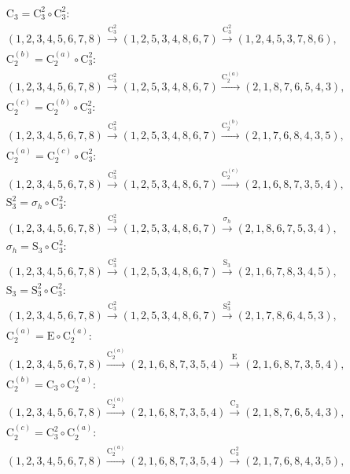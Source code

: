 \begin{align*}
& \mathrm{C}_{3} = \mathrm{C}_{3}^{2} \circ \mathrm{C}_{3}^{2}:\; \\& (1,2,3,4,5,6,7,8) \xrightarrow{\mathrm{C}_{3}^{2}} (1,2,5,3,4,8,6,7) \xrightarrow{\mathrm{C}_{3}^{2}} (1,2,4,5,3,7,8,6), \\
& \mathrm{C}_{2}^{(b)} = \mathrm{C}_{2}^{(a)} \circ \mathrm{C}_{3}^{2}:\; \\& (1,2,3,4,5,6,7,8) \xrightarrow{\mathrm{C}_{3}^{2}} (1,2,5,3,4,8,6,7) \xrightarrow{\mathrm{C}_{2}^{(a)}} (2,1,8,7,6,5,4,3), \\
& \mathrm{C}_{2}^{(c)} = \mathrm{C}_{2}^{(b)} \circ \mathrm{C}_{3}^{2}:\; \\& (1,2,3,4,5,6,7,8) \xrightarrow{\mathrm{C}_{3}^{2}} (1,2,5,3,4,8,6,7) \xrightarrow{\mathrm{C}_{2}^{(b)}} (2,1,7,6,8,4,3,5), \\
& \mathrm{C}_{2}^{(a)} = \mathrm{C}_{2}^{(c)} \circ \mathrm{C}_{3}^{2}:\; \\& (1,2,3,4,5,6,7,8) \xrightarrow{\mathrm{C}_{3}^{2}} (1,2,5,3,4,8,6,7) \xrightarrow{\mathrm{C}_{2}^{(c)}} (2,1,6,8,7,3,5,4), \\
& \mathrm{S}_{3}^{2} = \sigma_{h} \circ \mathrm{C}_{3}^{2}:\; \\& (1,2,3,4,5,6,7,8) \xrightarrow{\mathrm{C}_{3}^{2}} (1,2,5,3,4,8,6,7) \xrightarrow{\sigma_{h}} (2,1,8,6,7,5,3,4), \\
& \sigma_{h} = \mathrm{S}_{3} \circ \mathrm{C}_{3}^{2}:\; \\& (1,2,3,4,5,6,7,8) \xrightarrow{\mathrm{C}_{3}^{2}} (1,2,5,3,4,8,6,7) \xrightarrow{\mathrm{S}_{3}} (2,1,6,7,8,3,4,5), \\
& \mathrm{S}_{3} = \mathrm{S}_{3}^{2} \circ \mathrm{C}_{3}^{2}:\; \\& (1,2,3,4,5,6,7,8) \xrightarrow{\mathrm{C}_{3}^{2}} (1,2,5,3,4,8,6,7) \xrightarrow{\mathrm{S}_{3}^{2}} (2,1,7,8,6,4,5,3), \\
& \mathrm{C}_{2}^{(a)} = \mathrm{E} \circ \mathrm{C}_{2}^{(a)}:\; \\& (1,2,3,4,5,6,7,8) \xrightarrow{\mathrm{C}_{2}^{(a)}} (2,1,6,8,7,3,5,4) \xrightarrow{\mathrm{E}} (2,1,6,8,7,3,5,4), \\
& \mathrm{C}_{2}^{(b)} = \mathrm{C}_{3} \circ \mathrm{C}_{2}^{(a)}:\; \\& (1,2,3,4,5,6,7,8) \xrightarrow{\mathrm{C}_{2}^{(a)}} (2,1,6,8,7,3,5,4) \xrightarrow{\mathrm{C}_{3}} (2,1,8,7,6,5,4,3), \\
& \mathrm{C}_{2}^{(c)} = \mathrm{C}_{3}^{2} \circ \mathrm{C}_{2}^{(a)}:\; \\& (1,2,3,4,5,6,7,8) \xrightarrow{\mathrm{C}_{2}^{(a)}} (2,1,6,8,7,3,5,4) \xrightarrow{\mathrm{C}_{3}^{2}} (2,1,7,6,8,4,3,5), \\

\end{align*}
